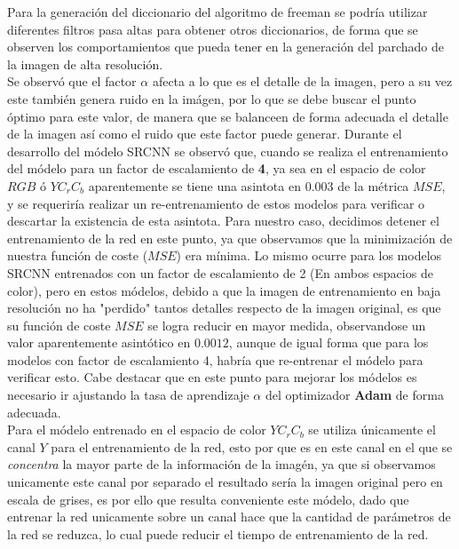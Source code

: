 Para la generación del diccionario del algoritmo de freeman se podría utilizar diferentes filtros pasa altas para obtener otros
diccionarios, de forma que se observen los comportamientos que pueda tener en la generación del parchado de la imagen de
alta resolución.\\
Se observó que el factor $\alpha$ afecta a lo que es el detalle de la imagen, pero a su vez este también genera ruido en la imágen,
por lo que se debe buscar el punto óptimo para este valor, de manera que se balanceen de forma adecuada el detalle de la imagen
así como el ruido que este factor puede generar.
Durante el desarrollo del módelo SRCNN se observó que, cuando se realiza el entrenamiento del módelo para un factor de escalamiento
de \textbf{4}, ya sea en el espacio de color $RGB$ ó $YC_rC_b$ aparentemente se tiene una asintota en $0.003$ de la métrica $MSE$,
y se requeriría realizar un re-entrenamiento de estos modelos para verificar o descartar la existencia de esta asintota. Para
nuestro caso, decidimos detener el entrenamiento de la red en este punto, ya que observamos que la minimización de nuestra función
de coste ($MSE$) era mínima. Lo mismo ocurre para los modelos SRCNN entrenados con un factor de escalamiento de 2 (En ambos
espacios de color), pero en estos módelos, debido a que la imagen de entrenamiento en baja resolución no ha "perdido" tantos
detalles respecto de la imagen original, es que su función de coste $MSE$ se logra reducir en mayor medida, observandose un valor
aparentemente asintótico en $0.0012$, aunque de igual forma que para los modelos con factor de escalamiento 4, habría que re-entrenar
el módelo para verificar esto. Cabe destacar que en este punto para mejorar los módelos es necesario ir ajustando la tasa de aprendizaje
$\alpha$ del optimizador \textbf{Adam} de forma adecuada.\\
Para el módelo entrenado en el espacio de color $YC_rC_b$ se utiliza únicamente el canal $Y$ para el entrenamiento de la red,
esto por que es en este canal en el que se \emph{concentra} la mayor parte de la información de la imagén, ya que si observamos
unicamente este canal por separado el resultado sería la imagen original pero en escala de grises, es por ello que resulta conveniente
este módelo, dado que entrenar la red unicamente sobre un canal hace que la cantidad de parámetros de la red se reduzca, lo cual
puede reducir el tiempo de entrenamiento de la red.